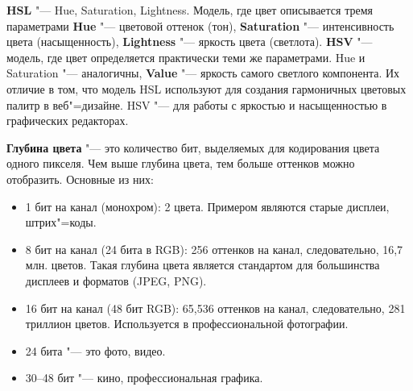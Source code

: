 \textbf{HSL} "--- Hue, Saturation, Lightness. Модель, где цвет описывается тремя параметрами \textbf{Hue} "--- цветовой оттенок (тон), \textbf{Saturation} "--- интенсивность цвета (насыщенность), \textbf{Lightness} "--- яркость цвета (светлота). \textbf{HSV} "--- модель, где цвет определяется практически теми же параметрами. Hue и Saturation "--- аналогичны, \textbf{Value} "--- яркость самого светлого компонента. Их отличие в том, что модель HSL используют для создания гармоничных цветовых палитр в веб"=дизайне. HSV "--- для работы с яркостью и насыщенностью в графических редакторах. \cite{vasilev2005cg}

\textbf{Глубина цвета} "--- это количество бит, выделяемых для кодирования цвета одного пикселя. Чем выше глубина цвета, тем больше оттенков можно отобразить. Основные из них:
\begin{itemize}
    \item 1 бит на канал (монохром): 2 цвета. Примером являются старые дисплеи, штрих"=коды.
    \item 8 бит на канал (24 бита в RGB): 256 оттенков на канал, следовательно, 16,7 млн. цветов. Такая глубина цвета является стандартом для большинства дисплеев и форматов (JPEG, PNG).
    \item 16 бит на канал (48 бит RGB): 65,536 оттенков на канал, следовательно, 281 триллион цветов. Используется в профессиональной фотографии.
    \item 24 бита "--- это фото, видео.
    \item 30--48 бит "--- кино, профессиональная графика.
\end{itemize}